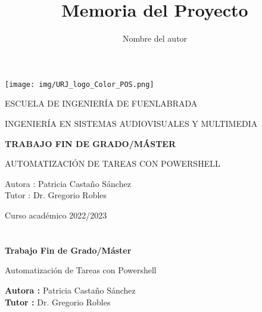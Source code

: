 \documentclass[a4paper, 12pt]{book}
\title{Memoria del Proyecto}
\author{Nombre del autor}
\begin{document}

\begin{titlepage}
\begin{center}
\texttt{[image: img/URJ\_logo\_Color\_POS.png]}

\vspace{1.75cm}

\LARGE
ESCUELA DE INGENIERÍA DE FUENLABRADA
\vspace{1cm}

\LARGE
INGENIERÍA EN SISTEMAS AUDIOVISUALES Y MULTIMEDIA

\vspace{1cm}
\LARGE
\textbf{TRABAJO FIN DE GRADO/MÁSTER}

\vspace{2cm}

\Large
AUTOMATIZACIÓN DE TAREAS CON POWERSHELL

\vspace{2cm}

\large
Autora : Patricia Castaño Sánchez \\
Tutor : Dr. Gregorio Robles \\
\vspace{1cm}

\large
Curso académico 2022/2023

\end{center}
\end{titlepage}

\newpage
\mbox{}
\thispagestyle{empty} %



\clearpage
{}
\chapter*{}

\vspace{-4cm}
\begin{center}
\LARGE
\textbf{Trabajo Fin de Grado/Máster}

\vspace{1cm}
\large
Automatización de Tareas con Powershell

\vspace{1cm}
\large
\textbf{Autora :} Patricia Castaño Sánchez \\
\textbf{Tutor :} Dr. Gregorio Robles

\end{center}
\end{document}
